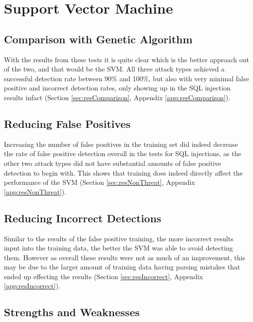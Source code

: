 \section{Support Vector Machine}
\subsection{Comparison with Genetic Algorithm}

With the results from these tests it is quite clear which is the better approach out of the two, and that would be the SVM.  All three attack types achieved a successful detection rate between 90\% and 100\%, but also with very minimal false positive and incorrect detection rates, only showing up in the SQL injection results infact (Section \ref{sec:resComparison}, Appendix \ref{app:resComparison}).  

\subsection{Reducing False Positives}

Increasing the number of false positives in the training set did indeed decrease the rate of false positive detection overall in the tests for SQL injections, as the other two attack types did not have substantial amounts of false positive detection to begin with.  This shows that training does indeed directly affect the performance of the SVM (Section \ref{sec:resNonThreat}, Appendix \ref{app:resNonThreat}). 

\subsection{Reducing Incorrect Detections}

Similar to the results of the false positive training, the more incorrect results input into the training data, the better the SVM was able to avoid detecting them.  However as overall these results were not as much of an improvement, this may be due to the larger amount of training data having parsing mistakes that ended up effecting the results (Section \ref{sec:resIncorrect}, Appendix \ref{app:resIncorrect}).

\subsection{Strengths and Weaknesses} \label{sec:svmDisadvantages}

